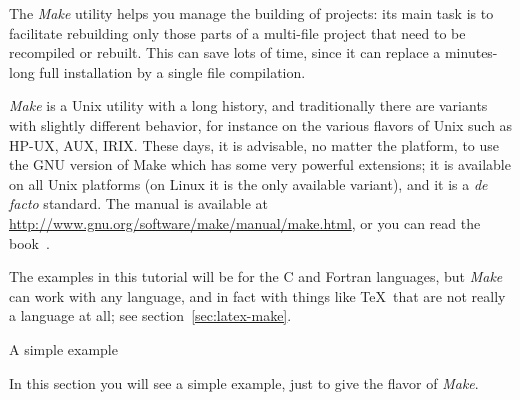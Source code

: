 
\lstset{language=bash}

The \emph{Make} utility helps you manage the building of
projects: its main task is to facilitate rebuilding only those parts 
of a multi-file project that need to be recompiled or rebuilt.
This can save lots of time, since it
can replace a minutes-long full installation by a single file
compilation.

\emph{Make} is a Unix utility with a long history, and traditionally
there are variants with slightly different behavior, 
for instance on the various
flavors of Unix such as HP-UX, AUX, IRIX. 
These days, it is advisable, no
matter the platform, to use the GNU version of Make which has some
very powerful extensions; it is available on all Unix platforms
(on Linux it is the only available variant), and it is a {\it de
  facto} standard. The manual is available at
\url{http://www.gnu.org/software/make/manual/make.html}, or you can
read the book~\cite{OReilly-GnuMake}.

The examples in this
tutorial will be for the C and Fortran languages, but \emph{Make} can
work with any language, and in fact with things like \TeX\ that are
not really a language at all; see section~\ref{sec:latex-make}.

 {A simple example}

\begin{purpose}
In this section you will see a simple example, just to give the flavor of
\emph{Make}.
\end{purpose}

